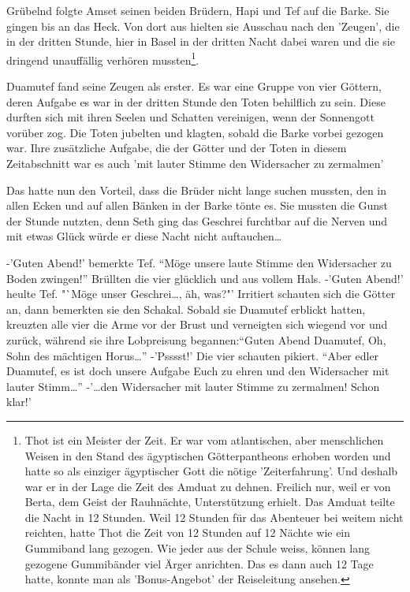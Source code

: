 \documentclass[11pt,titlepage,a5paper]{book}
\begin{document}
Grübelnd folgte Amset seinen beiden Brüdern, Hapi und Tef auf die Barke. Sie gingen bis an das Heck. Von dort aus hielten sie Ausschau nach den 'Zeugen', die in der dritten Stunde, hier in Basel in der dritten Nacht dabei waren und die sie dringend unauffällig verhören mussten\footnote{Thot ist ein Meister der Zeit. Er war vom atlantischen, aber menschlichen Weisen in den Stand des ägyptischen Götterpantheons erhoben worden und hatte so als einziger ägyptischer Gott die nötige 'Zeiterfahrung'. Und deshalb war er in der Lage die Zeit des Amduat zu dehnen. Freilich nur, weil er von Berta, dem Geist der Rauhnächte, Unterstützung erhielt. Das Amduat teilte die Nacht in 12 Stunden. Weil 12 Stunden für das Abenteuer bei weitem nicht reichten, hatte Thot die Zeit von 12 Stunden auf 12 Nächte wie ein Gummiband lang gezogen. Wie jeder aus der Schule weiss, können lang gezogene Gummibänder viel Ärger anrichten. Das es dann auch 12 Tage hatte, konnte man als 'Bonus-Angebot' der Reiseleitung ansehen.}.

Duamutef fand seine Zeugen als erster. Es war eine Gruppe von vier Göttern, deren Aufgabe es war in der dritten Stunde den Toten behilflich zu sein. Diese durften sich mit ihren Seelen und Schatten vereinigen, wenn der Sonnengott vorüber zog. Die Toten jubelten und klagten, sobald die Barke vorbei gezogen war. Ihre zusätzliche Aufgabe, die der Götter und der Toten in diesem Zeitabschnitt war es auch 'mit lauter Stimme den Widersacher zu zermalmen'

Das hatte nun den Vorteil, dass die Brüder nicht lange suchen mussten, den in allen Ecken und auf allen Bänken in der Barke tönte es. Sie mussten die Gunst der Stunde nutzten, denn Seth ging das Geschrei furchtbar auf die Nerven und mit etwas Glück würde er diese Nacht nicht auftauchen\dots

-'Guten Abend!' bemerkte Tef. {\Large"`Möge unsere laute Stimme den Widersacher zu Boden zwingen!"'} Brüllten die vier glücklich und aus vollem Hals. -{\LARGE'Guten Abend!'} heulte Tef. {\Large"`Möge unser Geschrei\dots}, äh, was?"' Irritiert schauten sich die Götter an, dann bemerkten sie den Schakal. Sobald sie Duamutef erblickt hatten, kreuzten alle vier die Arme vor der Brust und verneigten sich wiegend vor und zurück, während sie ihre Lobpreisung begannen:{\Large"`Guten Abend Duamutef, Oh, Sohn des mächtigen Horus\dots"'} -'{\Large Psssst!}' Die vier schauten pikiert. "`Aber edler Duamutef, es ist doch unsere Aufgabe Euch zu ehren und den Widersacher mit lauter Stimm\dots"' -'\dots den Widersacher mit lauter Stimme zu zermalmen! Schon klar!' 
\end{document}
